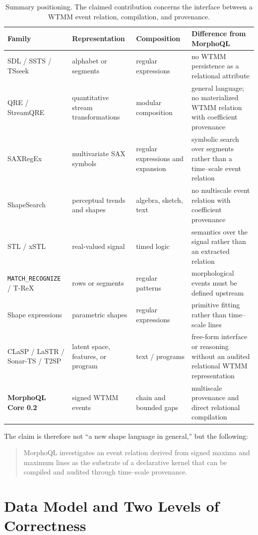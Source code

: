 \documentclass[11pt,a4paper]{article}
\newcommand{\code}[1]{\texttt{#1}}
\begin{document}
\begin{table}[H]
\centering
\caption{Summary positioning. The claimed contribution concerns the interface between a WTMM event relation, compilation, and provenance.}
\small
\begin{tabularx}{\textwidth}{@{}p{3.3cm}p{3.0cm}p{3.0cm}X@{}}
\toprule
Family & Representation & Composition & Difference from MorphoQL \\
\midrule
SDL / SSTS / TSseek & alphabet or segments & regular expressions & no WTMM persistence as a relational attribute \\
QRE / StreamQRE & quantitative stream transformations & modular composition & general language; no materialized WTMM relation with coefficient provenance \\
SAXRegEx & multivariate SAX symbols & regular expressions and expansion & symbolic search over segments rather than a time--scale event relation \\
ShapeSearch & perceptual trends and shapes & algebra, sketch, text & no multiscale event relation with coefficient provenance \\
STL / xSTL & real-valued signal & timed logic & semantics over the signal rather than an extracted relation \\
\code{MATCH\_RECOGNIZE} / T-ReX & rows or segments & regular patterns & morphological events must be defined upstream \\
Shape expressions & parametric shapes & regular expressions & primitive fitting rather than time--scale lines \\
CLaSP / LaSTR / Sonar-TS / T2SP & latent space, features, or program & text / programs & free-form interface or reasoning without an audited relational WTMM representation \\
\textbf{MorphoQL Core 0.2} & signed WTMM events & chain and bounded gaps & multiscale provenance and direct relational compilation \\
\bottomrule
\end{tabularx}
\end{table}

The claim is therefore not ``a new shape language in general,'' but the following:
\begin{quote}
MorphoQL investigates an event relation derived from signed maxima and maximum lines as the substrate of a declarative kernel that can be compiled and audited through time--scale provenance.
\end{quote}

\section{Data Model and Two Levels of Correctness}
\end{document}
